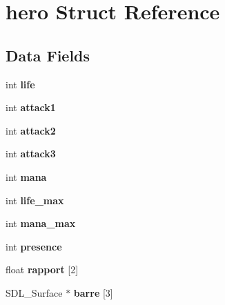 \hypertarget{structhero}{\section{hero Struct Reference}
\label{structhero}
}
\subsection*{Data Fields}
\begin{DoxyCompactItemize}
\item 
\hypertarget{structhero_adf488ff0ce8098cd956c07890cbc5d50}{int {\bfseries life}}\label{structhero_adf488ff0ce8098cd956c07890cbc5d50}

\item 
\hypertarget{structhero_a16ae33ca458be23255ceb8316637a7d3}{int {\bfseries attack1}}\label{structhero_a16ae33ca458be23255ceb8316637a7d3}

\item 
\hypertarget{structhero_ae1c6fdc5088cba7636ba692d3be1e844}{int {\bfseries attack2}}\label{structhero_ae1c6fdc5088cba7636ba692d3be1e844}

\item 
\hypertarget{structhero_a7d785b47ed56eacc8a05f1554feb4209}{int {\bfseries attack3}}\label{structhero_a7d785b47ed56eacc8a05f1554feb4209}

\item 
\hypertarget{structhero_a0b461b6df17bd8c922b97c6d282ace10}{int {\bfseries mana}}\label{structhero_a0b461b6df17bd8c922b97c6d282ace10}

\item 
\hypertarget{structhero_ad1c144a8e042de716cd415043ffd9783}{int {\bfseries life\-\_\-max}}\label{structhero_ad1c144a8e042de716cd415043ffd9783}

\item 
\hypertarget{structhero_a788ce099569709afbeba9e4b8e6963ad}{int {\bfseries mana\-\_\-max}}\label{structhero_a788ce099569709afbeba9e4b8e6963ad}

\item 
\hypertarget{structhero_a3ca53f52ea09ed5230ca465a580a6a1d}{int {\bfseries presence}}\label{structhero_a3ca53f52ea09ed5230ca465a580a6a1d}

\item 
\hypertarget{structhero_a0de02cfb2c9b02ea369ba823162009d6}{float {\bfseries rapport} \mbox{[}2\mbox{]}}\label{structhero_a0de02cfb2c9b02ea369ba823162009d6}

\item 
\hypertarget{structhero_a17057614d6648d6d11bc456e1494848e}{S\-D\-L\-\_\-\-Surface $\ast$ {\bfseries barre} \mbox{[}3\mbox{]}}\label{structhero_a17057614d6648d6d11bc456e1494848e}


\end{DoxyCompactItemize}

